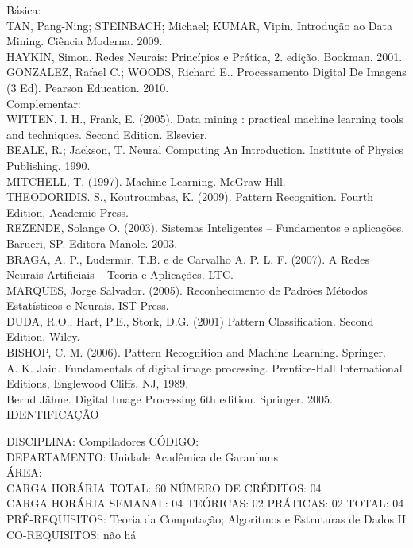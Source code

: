 \documentclass[
	12pt,				%
	openright,			%
  oneside,     %
	a4paper,			%
	chapter=TITLE,		%
	english,			%
	french,				%
	spanish,			%
	brazil				%
	]{abntex2}
\begin{document}
\begin{apendicesenv}
Básica:\\
TAN, Pang-Ning; STEINBACH; Michael; KUMAR, Vipin. Introdução ao Data
Mining. Ciência Moderna. 2009.\\
HAYKIN, Simon. Redes Neurais: Princípios e Prática, 2. edição. Bookman.
2001.\\
GONZALEZ, Rafael C.; WOODS, Richard E.. Processamento Digital De Imagens
(3 Ed). Pearson Education. 2010.\\
Complementar:\\
WITTEN, I. H., Frank, E. (2005). Data mining : practical machine
learning tools and techniques. Second Edition. Elsevier.\\
BEALE, R.; Jackson, T. Neural Computing  An Introduction. Institute
of Physics Publishing. 1990.\\
MITCHELL, T. (1997). Machine Learning. McGraw-Hill.\\
THEODORIDIS. S., Koutroumbas, K. (2009). Pattern Recognition. Fourth
Edition, Academic Press.\\
REZENDE, Solange O. (2003). Sistemas Inteligentes -- Fundamentos e
aplicações. Barueri, SP. Editora Manole. 2003.\\
BRAGA, A. P., Ludermir, T.B. e de Carvalho A. P. L. F. (2007). A Redes
Neurais Artificiais -- Teoria e Aplicações. LTC.\\
MARQUES, Jorge Salvador. (2005). Reconhecimento de Padrões  Métodos
Estatísticos e Neurais. IST Press.\\
DUDA, R.O., Hart, P.E., Stork, D.G. (2001) Pattern Classification.
Second Edition. Wiley.\\
BISHOP, C. M. (2006). Pattern Recognition and Machine Learning.
Springer.\\
A. K. Jain. Fundamentals of digital image processing. Prentice-Hall
International Editions, Englewood Cliffs, NJ, 1989.\\
Bernd Jähne. Digital Image Processing 6th edition. Springer. 2005.\\


\newpage IDENTIFICAÇÃO

DISCIPLINA: Compiladores CÓDIGO:\\ 
DEPARTAMENTO: Unidade Acadêmica de Garanhuns\\
ÁREA: \\
CARGA HORÁRIA TOTAL: 60 NÚMERO DE CRÉDITOS: 04\\
CARGA HORÁRIA SEMANAL: 04 TEÓRICAS: 02 PRÁTICAS: 02 TOTAL: 04\\
PRÉ-REQUISITOS: Teoria da Computação; Algoritmos e Estruturas de Dados II\\
CO-REQUISITOS: não há


\end{apendicesenv}
\end{document}

